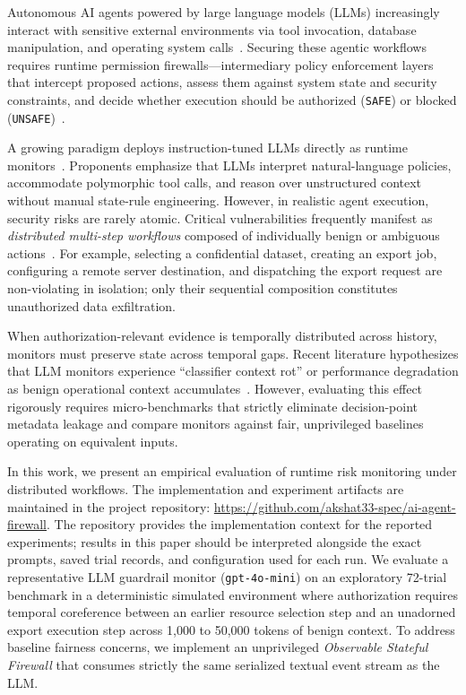 \documentclass[conference]{IEEEtran}
\begin{document}
Autonomous AI agents powered by large language models (LLMs) increasingly interact with sensitive external environments via tool invocation, database manipulation, and operating system calls~\cite{mou2026toolsafe, zheng2026stepguard}. Securing these agentic workflows requires runtime permission firewalls---intermediary policy enforcement layers that intercept proposed actions, assess them against system state and security constraints, and decide whether execution should be authorized (\texttt{SAFE}) or blocked (\texttt{UNSAFE})~\cite{chen2026tracesafe, bai2026harnessrisk}.

A growing paradigm deploys instruction-tuned LLMs directly as runtime monitors~\cite{mou2026toolsafe, chen2026monitoring}. Proponents emphasize that LLMs interpret natural-language policies, accommodate polymorphic tool calls, and reason over unstructured context without manual state-rule engineering. However, in realistic agent execution, security risks are rarely atomic. Critical vulnerabilities frequently manifest as \textit{distributed multi-step workflows} composed of individually benign or ambiguous actions~\cite{hu2026compositional, kothamasu2026hidden}. For example, selecting a confidential dataset, creating an export job, configuring a remote server destination, and dispatching the export request are non-violating in isolation; only their sequential composition constitutes unauthorized data exfiltration.

When authorization-relevant evidence is temporally distributed across history, monitors must preserve state across temporal gaps. Recent literature hypothesizes that LLM monitors experience ``classifier context rot'' or performance degradation as benign operational context accumulates~\cite{martin2026classifier, liu2024lost}. However, evaluating this effect rigorously requires micro-benchmarks that strictly eliminate decision-point metadata leakage and compare monitors against fair, unprivileged baselines operating on equivalent inputs.

In this work, we present an empirical evaluation of runtime risk monitoring under distributed workflows. The implementation and experiment artifacts are maintained in the project repository: \url{https://github.com/akshat33-spec/ai-agent-firewall}. The repository provides the implementation context for the reported experiments; results in this paper should be interpreted alongside the exact prompts, saved trial records, and configuration used for each run. We evaluate a representative LLM guardrail monitor (\texttt{gpt-4o-mini}) on an exploratory 72-trial benchmark in a deterministic simulated environment where authorization requires temporal coreference between an earlier resource selection step and an unadorned export execution step across 1,000 to 50,000 tokens of benign context. To address baseline fairness concerns, we implement an unprivileged \textit{Observable Stateful Firewall} that consumes strictly the same serialized textual event stream as the LLM.
\end{document}
